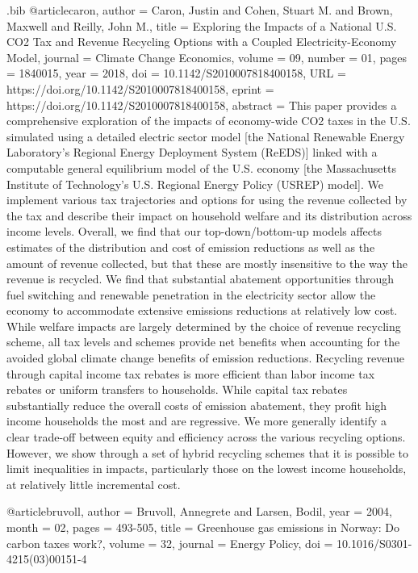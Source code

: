\begin{filecontents}{.bib}
@article{caron,
    author = {{Caron, Justin and Cohen, Stuart M. and Brown, Maxwell and Reilly, John M.}},
    title = {Exploring the Impacts of a National U.S. CO2 Tax and Revenue Recycling Options with a Coupled Electricity-Economy Model},
    journal = {Climate Change Economics},
    volume = {09},
    number = {01},
    pages = {1840015},
    year = {2018},
    doi = {10.1142/S2010007818400158},
    URL = {https://doi.org/10.1142/S2010007818400158},
    eprint = {https://doi.org/10.1142/S2010007818400158},
    abstract = {This paper provides a comprehensive exploration of the impacts of economy-wide CO2 taxes in the U.S. simulated using a detailed electric sector model [the National Renewable Energy Laboratory’s Regional Energy Deployment System (ReEDS)] linked with a computable general equilibrium model of the U.S. economy [the Massachusetts Institute of Technology’s U.S. Regional Energy Policy (USREP) model]. We implement various tax trajectories and options for using the revenue collected by the tax and describe their impact on household welfare and its distribution across income levels. Overall, we find that our top-down/bottom-up models affects estimates of the distribution and cost of emission reductions as well as the amount of revenue collected, but that these are mostly insensitive to the way the revenue is recycled. We find that substantial abatement opportunities through fuel switching and renewable penetration in the electricity sector allow the economy to accommodate extensive emissions reductions at relatively low cost. While welfare impacts are largely determined by the choice of revenue recycling scheme, all tax levels and schemes provide net benefits when accounting for the avoided global climate change benefits of emission reductions. Recycling revenue through capital income tax rebates is more efficient than labor income tax rebates or uniform transfers to households. While capital tax rebates substantially reduce the overall costs of emission abatement, they profit high income households the most and are regressive. We more generally identify a clear trade-off between equity and efficiency across the various recycling options. However, we show through a set of hybrid recycling schemes that it is possible to limit inequalities in impacts, particularly those on the lowest income households, at relatively little incremental cost.}
}


@article{bruvoll,
  author = {{Bruvoll, Annegrete and Larsen, Bodil}},
  year = {2004},
  month = {02},
  pages = {493-505},
  title = {Greenhouse gas emissions in Norway: Do carbon taxes work?},
  volume = {32},
  journal = {Energy Policy},
  doi = {10.1016/S0301-4215(03)00151-4}
}



\end{filecontents}
